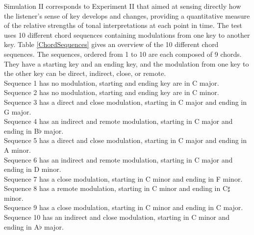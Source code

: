 Simulation II corresponds to Experiment II that aimed at sensing
directly how the listener's sense of key develops and changes,
providing a quantitative measure of the relative strengths of
tonal interpretations at each point in time. The test uses 10
different chord sequences containing modulations from one key to
another key. Table \ref{ChordSequences} gives an overview of the
10 different chord sequences. The sequences, ordered from 1 to 10
are each composed of 9 chords. They have a starting key and an
ending key, and the modulation from one key to the other key can
be direct, indirect, close, or remote.\\
Sequence 1 has no modulation, starting and ending key are in C
major.\\
Sequence 2 has no modulation, starting and ending key are in C
minor.\\
Sequence 3 has a direct and close modulation, starting in C major
and ending in G major.\\
Sequence 4 has an indirect and remote modulation, starting in C
major and ending in B$\flat$ major.\\
Sequence 5 has a direct and close modulation, starting in C major
and ending in A minor.\\
Sequence 6 has an indirect and remote modulation, starting in C
major and ending in D minor.\\
Sequence 7 has a close modulation, starting in C minor and ending
in F minor.\\
Sequence 8 has a remote modulation, starting in C minor and
ending in C$\sharp$ minor.\\
Sequence 9 has a close modulation, starting in C minor and ending
in C major.\\
Sequence 10 has an indirect and close modulation, starting in C
minor and ending in A$\flat$ major.\\
